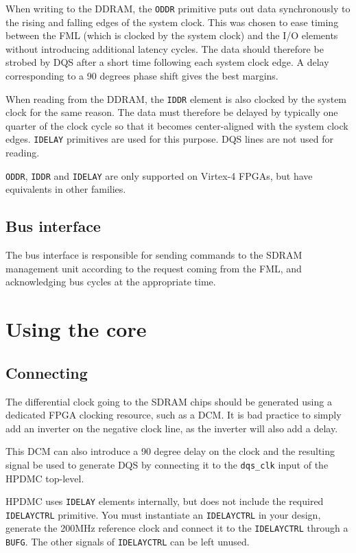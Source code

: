 \documentclass[a4paper,11pt]{article}
\begin{document}
When writing to the DDRAM, the \verb!ODDR! primitive puts out data synchronously to the rising and falling edges of the system clock. This was chosen to ease timing between the FML (which is clocked by the system clock) and the I/O elements without introducing additional latency cycles. The data should therefore be strobed by DQS after a short time following each system clock edge. A delay corresponding to a 90 degrees phase shift gives the best margins.

When reading from the DDRAM, the \verb!IDDR! element is also clocked by the system clock for the same reason. The data must therefore be delayed by typically one quarter of the clock cycle so that it becomes center-aligned with the system clock edges. \verb!IDELAY! primitives are used for this purpose. DQS lines are not used for reading.

\verb!ODDR!, \verb!IDDR! and \verb!IDELAY! are only supported on Virtex-4 FPGAs, but have equivalents in other families.

\subsection{Bus interface}
The bus interface is responsible for sending commands to the SDRAM management unit according to the request coming from the FML, and acknowledging bus cycles at the appropriate time.

\section{Using the core}
\subsection{Connecting}
The differential clock going to the SDRAM chips should be generated using a dedicated FPGA clocking resource, such as a DCM. It is bad practice to simply add an inverter on the negative clock line, as the inverter will also add a delay.

This DCM can also introduce a 90 degree delay on the clock and the resulting signal be used to generate DQS by connecting it to the \verb!dqs_clk! input of the HPDMC top-level.

HPDMC uses \verb!IDELAY! elements internally, but does not include the required \verb!IDELAYCTRL! primitive. You must instantiate an \verb!IDELAYCTRL! in your design, generate the 200MHz reference clock and connect it to the \verb!IDELAYCTRL! through a \verb!BUFG!. The other signals of \verb!IDELAYCTRL! can be left unused.
\end{document}
